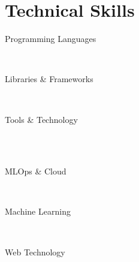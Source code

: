 \section{Technical Skills}    

\begin{SkillPart}{0.27}{Programming Languages}
    
     \\[5pt]

\end{SkillPart}
%
\hfill
%
\begin{SkillPart}{0.33}{Libraries \& Frameworks}
    
     \\[5pt]
    
\end{SkillPart}
%
\hfill
%
\begin{SkillPart}{0.3}{Tools \& Technology}
    
    \Skill{\LaTeX}
     \\[5pt]
    \\[5pt]

\end{SkillPart}
%
\vspace{1pt} \noindent
%
\begin{SkillPart}{0.27}{MLOps \& Cloud}
    
    \\[5pt]

\end{SkillPart}
%
\hfill
%
\begin{SkillPart}{0.33}{Machine Learning}

     \\[5pt]

\end{SkillPart}
%
\hfill
%
\begin{SkillPart}{0.3}{Web Technology}
    
     \\[5pt]

\end{SkillPart}
\smallskip